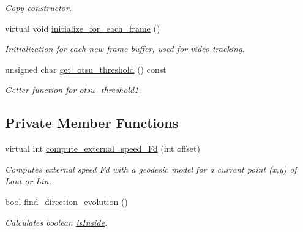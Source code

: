 \begin{DoxyCompactItemize}
\begin{DoxyCompactList}\small\item\em Copy constructor. \end{DoxyCompactList}\item 
\hypertarget{classofeli_1_1_geodesic_a_c_a5f45547b45b9743a6fdf0388715dfcbc}{virtual void \hyperlink{classofeli_1_1_geodesic_a_c_a5f45547b45b9743a6fdf0388715dfcbc}{initialize\-\_\-for\-\_\-each\-\_\-frame} ()}\label{classofeli_1_1_geodesic_a_c_a5f45547b45b9743a6fdf0388715dfcbc}

\begin{DoxyCompactList}\small\item\em Initialization for each new frame buffer, used for video tracking. \end{DoxyCompactList}\item 
\hypertarget{classofeli_1_1_geodesic_a_c_ab2654dfef80654187878db4e961b2bfd}{unsigned char \hyperlink{classofeli_1_1_geodesic_a_c_ab2654dfef80654187878db4e961b2bfd}{get\-\_\-otsu\-\_\-threshold} () const }\label{classofeli_1_1_geodesic_a_c_ab2654dfef80654187878db4e961b2bfd}

\begin{DoxyCompactList}\small\item\em Getter function for \hyperlink{classofeli_1_1_geodesic_a_c_a1cde491f4e294413d5897e09fa0d3a39}{otsu\-\_\-threshold1}. \end{DoxyCompactList}\end{DoxyCompactItemize}
\subsection*{Private Member Functions}
\begin{DoxyCompactItemize}
\item 
virtual int \hyperlink{classofeli_1_1_geodesic_a_c_a1e4d1d3011526eaff49b5404f00f27f9}{compute\-\_\-external\-\_\-speed\-\_\-\-Fd} (int offset)
\begin{DoxyCompactList}\small\item\em Computes external speed {\itshape Fd} with a geodesic model for a current point {\itshape }(x,y) of \hyperlink{classofeli_1_1_active_contour_a31e0eb18a7ea6ae90acf66ed018fcd85}{Lout} or \hyperlink{classofeli_1_1_active_contour_a7662d4f5c8b87d3e642b08b7e341bd79}{Lin}. \end{DoxyCompactList}\item 
\hypertarget{classofeli_1_1_geodesic_a_c_a4cdf84261bfd4407e89984ea01f6c227}{bool \hyperlink{classofeli_1_1_geodesic_a_c_a4cdf84261bfd4407e89984ea01f6c227}{find\-\_\-direction\-\_\-evolution} ()}\label{classofeli_1_1_geodesic_a_c_a4cdf84261bfd4407e89984ea01f6c227}

\begin{DoxyCompactList}\small\item\em Calculates boolean \hyperlink{classofeli_1_1_geodesic_a_c_ada6b8ca4769ee7a03b0f47da3cbabc05}{is\-Inside}. \end{DoxyCompactList}\end{DoxyCompactItemize}
